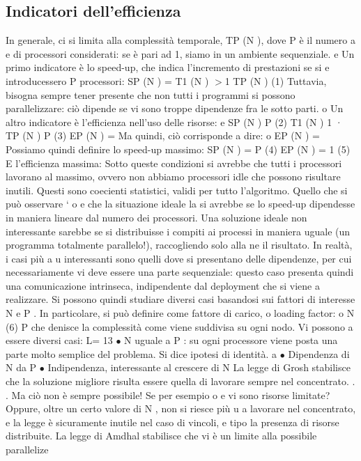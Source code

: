 \subsection{Indicatori dell'efficienza}
In generale, ci si limita alla complessità temporale, TP (N ), dove P è il numero
a
e
di processori considerati: se è pari ad 1, siamo in un ambiente sequenziale.
e
Un primo indicatore è lo speed-up, che indica l'incremento di prestazioni se si
e
introducessero P processori:
SP (N ) =
T1 (N )
$>$1
TP (N )
(1)
Tuttavia, bisogna sempre tener presente che non tutti i programmi si possono
parallelizzare: ciò dipende se vi sono troppe dipendenze fra le sotto parti.
o
Un altro indicatore è l'efficienza nell'uso delle risorse:
e
SP (N )
P
(2)
T1 (N ) 1
·
TP (N ) P
(3)
EP (N ) =
Ma quindi, ciò corrisponde a dire:
o
EP (N ) =
Possiamo quindi definire lo speed-up massimo:
SP (N ) = P
(4)
EP (N ) = 1
(5)
E l'efficienza massima:
Sotto queste condizioni si avrebbe che tutti i processori lavorano al massimo,
ovvero non abbiamo processori idle che possono risultare inutili. Questi sono
coecienti statistici, validi per tutto l'algoritmo. Quello che si può osservare `
o
e
che la situazione ideale la si avrebbe se lo speed-up dipendesse in maniera lineare dal numero dei processori. Una
soluzione ideale non interessante sarebbe
se si distribuisse i compiti ai processi in maniera uguale (un programma totalmente parallelo!), raccogliendo solo alla
ne il risultato. In realtà, i casi più
a
u
interessanti sono quelli dove si presentano delle dipendenze, per cui necessariamente vi deve essere una parte
sequenziale: questo caso presenta quindi una
comunicazione intrinseca, indipendente dal deployment che si viene a realizzare.
Si possono quindi studiare diversi casi basandosi sui fattori di interesse N e
P . In particolare, si può definire come fattore di carico, o loading factor:
o
N
(6)
P
che denisce la complessità come viene suddivisa su ogni nodo. Vi possono
a
essere diversi casi:
L=
13
$\bullet$ N uguale a P : su ogni processore viene posta una parte molto semplice
del problema. Si dice ipotesi di identità.
a
$\bullet$ Dipendenza di N da P
$\bullet$ Indipendenza, interessante al crescere di N
La legge di Grosh stabilisce che la soluzione migliore risulta essere quella di lavorare sempre nel concentrato. . . Ma
ciò non è sempre possibile! Se per esempio
o
e
vi sono risorse limitate? Oppure, oltre un certo valore di N , non si riesce più
u
a lavorare nel concentrato, e la legge è sicuramente inutile nel caso di vincoli,
e
tipo la presenza di risorse distribuite.
La legge di Amdhal stabilisce che vi è un limite alla possibile parallelize
